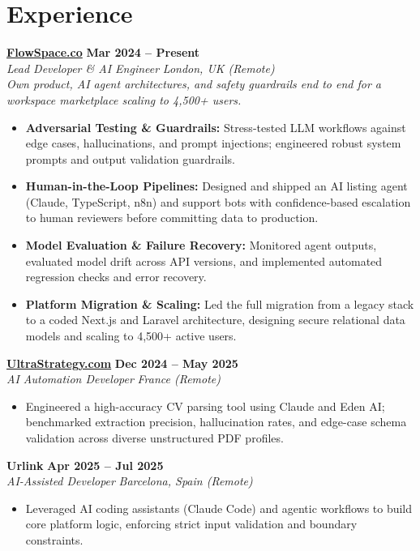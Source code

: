 \documentclass[a4paper,10pt]{article}
\newcommand{\role}[4]{%
 \textbf{#1} \hfill \textbf{#2}\\[1pt]%
 \textit{#3} \hfill \textit{#4}\\[1.5pt]%
}
\begin{document}
\section{Experience}

\role{\href{https://flowspace.co}{FlowSpace.co}}{Mar 2024 -- Present}{Lead Developer \& AI Engineer}{London, UK (Remote)}
\textit{Own product, AI agent architectures, and safety guardrails end to end for a workspace marketplace scaling to 4,500+ users.}
\begin{itemize}
 \item \textbf{Adversarial Testing \& Guardrails:} Stress-tested LLM workflows against edge cases, hallucinations, and prompt injections; engineered robust system prompts and output validation guardrails.
 \item \textbf{Human-in-the-Loop Pipelines:} Designed and shipped an AI listing agent (Claude, TypeScript, n8n) and support bots with confidence-based escalation to human reviewers before committing data to production.
 \item \textbf{Model Evaluation \& Failure Recovery:} Monitored agent outputs, evaluated model drift across API versions, and implemented automated regression checks and error recovery.
 \item \textbf{Platform Migration \& Scaling:} Led the full migration from a legacy stack to a coded Next.js and Laravel architecture, designing secure relational data models and scaling to 4,500+ active users.
\end{itemize}

\role{\href{https://ultrastrategy.com}{UltraStrategy.com}}{Dec 2024 -- May 2025}{AI Automation Developer}{France (Remote)}
\begin{itemize}
 \item Engineered a high-accuracy CV parsing tool using Claude and Eden AI; benchmarked extraction precision, hallucination rates, and edge-case schema validation across diverse unstructured PDF profiles.
\end{itemize}

\role{Urlink}{Apr 2025 -- Jul 2025}{AI-Assisted Developer}{Barcelona, Spain (Remote)}
\begin{itemize}
 \item Leveraged AI coding assistants (Claude Code) and agentic workflows to build core platform logic, enforcing strict input validation and boundary constraints.
\end{itemize}
\end{document}
